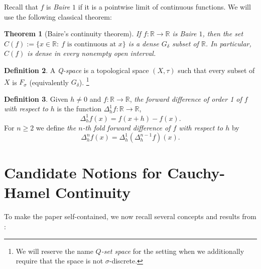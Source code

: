 \documentclass[11pt]{amsart} %
\newtheorem{theorem}{Theorem}[section]
\theoremstyle{definition}
\newtheorem{definition}[theorem]{Definition}
\newcommand{\R}{\mathbb{R}}
\begin{document}

Recall that $f$ is \emph{Baire $1$} if it is a pointwise limit of continuous functions.
We will use the following classical theorem:

\begin{theorem}[Baire's continuity theorem]\label{thm:baire-continuity}
If $f:\mathbb{R}\to\mathbb{R}$ is Baire $1$, then the set $
C(f):=\{x\in\mathbb{R}:\ f\text{ is continuous at }x\}$ 
is a dense $G_\delta$ subset of $\mathbb{R}$. In particular, $C(f)$ is dense in every nonempty open interval.
\end{theorem}

\begin{definition} A \emph{Q-space} \cite{25} is a topological space $(X,\tau)$ such that every subset of $X$ is $F_{\sigma}$ (equivalently $G_{\delta}$). \footnote{We will reserve the name \emph{$Q$-set space} \cite{23} for the setting when we additionally require that the space is not $\sigma$-discrete.}
\end{definition} 

\begin{definition} Given $h\neq 0$ and $f:\R\rightarrow \R$, \emph{the forward difference of order 1 of $f$ with respect to $h$} is the function $\Delta_{h}^{1}f:\R\rightarrow \R$, 
\begin{equation} 
\Delta_{h}^{1} f(x)=f(x+h)-f(x). 
\end{equation} 
For $n\geq 2$ we define \emph{the $n$-th fold forward difference of $f$ with respect to $h$} by
\begin{equation} 
\Delta_{h}^{n} f(x)=\Delta_{h}^{1} (\Delta_{h}^{n-1} f)(x).  
\end{equation} 
\end{definition} 





\section{Candidate Notions for Cauchy-Hamel Continuity}
\label{sec:3} 

To make the paper self-contained, we now recall several concepts and results
from \cite{10,11}:
\end{document}
